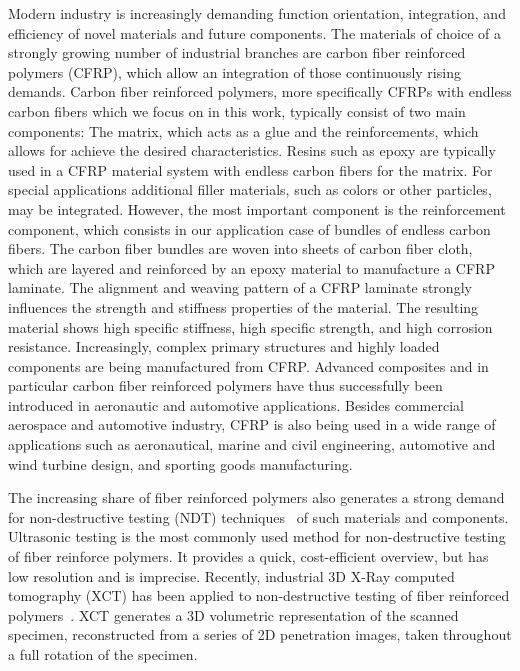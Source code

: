 Modern industry is increasingly demanding function orientation, integration, and efficiency of novel materials and future components. 
The materials of choice of a strongly growing number of industrial branches are carbon fiber reinforced polymers (CFRP), which allow an integration of those continuously rising demands.
Carbon fiber reinforced polymers, more specifically CFRPs with endless carbon fibers which we focus on in this work, typically consist of two main components: 
The matrix, which acts as a glue and the reinforcements, which allows for achieve the desired characteristics. 
Resins such as epoxy are typically used in a CFRP material system with endless carbon fibers for the matrix. 
For special applications additional filler materials, such as colors or other particles, may be integrated. 
However, the most important component is the reinforcement component, which consists in our application case of bundles of endless carbon fibers. 
The carbon fiber bundles are woven into sheets of carbon fiber cloth, which are layered and reinforced by an epoxy material to manufacture a CFRP laminate.
The alignment and weaving pattern of a CFRP laminate strongly influences the strength and stiffness properties of the material. The resulting material shows high specific stiffness, high specific strength, and high corrosion resistance. 
Increasingly, complex primary structures and highly loaded components are being manufactured from CFRP.
Advanced composites and in particular carbon fiber reinforced polymers have thus successfully been introduced in aeronautic and automotive applications. Besides commercial aerospace and automotive industry, CFRP is also being used
in a wide range of applications such as aeronautical, marine and civil engineering, automotive and wind turbine design,
and sporting goods manufacturing.



The increasing share of fiber reinforced polymers also generates a strong demand for non-destructive testing (NDT) techniques~\cite{Red2012} of such materials and components. Ultrasonic testing is the most commonly used method for non-destructive testing of fiber reinforce polymers.
It provides a quick, cost-efficient overview, but has low resolution and is imprecise. Recently, industrial 3D X-Ray computed tomography (XCT) has been applied to non-destructive testing of fiber reinforced polymers~\cite{Kastner2012}. XCT generates a 3D volumetric representation of the scanned specimen, reconstructed from a series of 2D penetration images, taken throughout a full rotation of the specimen. 

